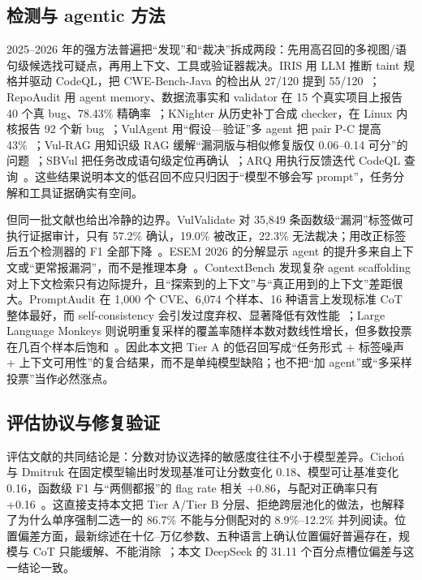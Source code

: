\documentclass[conference]{IEEEtran}
\begin{document}
\subsection{检测与 agentic 方法}

2025--2026 年的强方法普遍把“发现”和“裁决”拆成两段：先用高召回的多视图/语句级候选找可疑点，再用上下文、工具或验证器裁决。IRIS 用 LLM 推断 taint 规格并驱动 CodeQL，把 CWE-Bench-Java 的检出从 27/120 提到 55/120~\cite{li2025iris}；RepoAudit 用 agent memory、数据流事实和 validator 在 15 个真实项目上报告 40 个真 bug、78.43\% 精确率~\cite{guo2025repoaudit}；KNighter 从历史补丁合成 checker，在 Linux 内核报告 92 个新 bug~\cite{yang2025knighter}；VulAgent 用“假设—验证”多 agent 把 pair P-C 提高 43\%~\cite{wang2026vulagent}；Vul-RAG 用知识级 RAG 缓解“漏洞版与相似修复版仅 0.06--0.14 可分”的问题~\cite{du2026vulrag}；SBVul 把任务改成语句级定位再确认~\cite{pinzger2026sbvul}；ARQ 用执行反馈迭代 CodeQL 查询~\cite{wang2026arq}。这些结果说明本文的低召回不应只归因于“模型不够会写 prompt”，任务分解和工具证据确实有空间。

但同一批文献也给出冷静的边界。VulValidate 对 35{,}849 条函数级“漏洞”标签做可执行证据审计，只有 57.2\% 确认，19.0\% 被改正，22.3\% 无法裁决；用改正标签后五个检测器的 F1 全部下降~\cite{zhang2026vulvalidate}。ESEM 2026 的分解显示 agent 的提升多来自上下文或“更常报漏洞”，而不是推理本身~\cite{chen2026agentdecomp}。ContextBench 发现复杂 agent scaffolding 对上下文检索只有边际提升，且“探索到的上下文”与“真正用到的上下文”差距很大。PromptAudit 在 1{,}000 个 CVE、6{,}074 个样本、16 种语言上发现标准 CoT 整体最好，而 self-consistency 会引发过度弃权、显著降低有效性能~\cite{camarato2026promptaudit}；Large Language Monkeys 则说明重复采样的覆盖率随样本数对数线性增长，但多数投票在几百个样本后饱和~\cite{brown2024monkeys}。因此本文把 Tier A 的低召回写成“任务形式 + 标签噪声 + 上下文可用性”的复合结果，而不是单纯模型缺陷；也不把“加 agent”或“多采样投票”当作必然涨点。

\subsection{评估协议与修复验证}

评估文献的共同结论是：分数对协议选择的敏感度往往不小于模型差异。Cichoń 与 Dmitruk 在固定模型输出时发现基准可让分数变化 0.18、模型可让基准变化 0.16，函数级 F1 与“两侧都报”的 flag rate 相关 +0.86，与配对正确率只有 +0.16~\cite{cichon2026protocol}。这直接支持本文把 Tier A/Tier B 分层、拒绝跨层池化的做法，也解释了为什么单序强制二选一的 86.7\% 不能与分侧配对的 8.9\%--12.2\% 并列阅读。位置偏差方面，最新综述在十亿--万亿参数、五种语言上确认位置偏好普遍存在，规模与 CoT 只能缓解、不能消除~\cite{li2026positionbias}；本文 DeepSeek 的 31.11 个百分点槽位偏差与这一结论一致。
\end{document}
